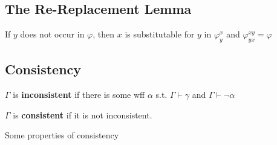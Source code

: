 \subsection{The Re-Replacement Lemma}

\begin{lemma}
    \label{lem:ReReplacementLemma}
    If $y$ does not occur in $\varphi$, then $x$ is substitutable for $y$ in $\varphi_y^x$ and $\varphi_{yx}^{xy} = \varphi$
\end{lemma}

\subsection{Consistency}

\begin{definition}[Consistency]
    $\Gamma$ is \textbf{inconsistent} if there is some wff $\alpha$ s.t. $\Gamma\vdash\gamma$ and $\Gamma\vdash\neg\alpha$

    $\Gamma$ is \textbf{consistent} if it is not inconsistent.
\end{definition}

Some properties of consistency


